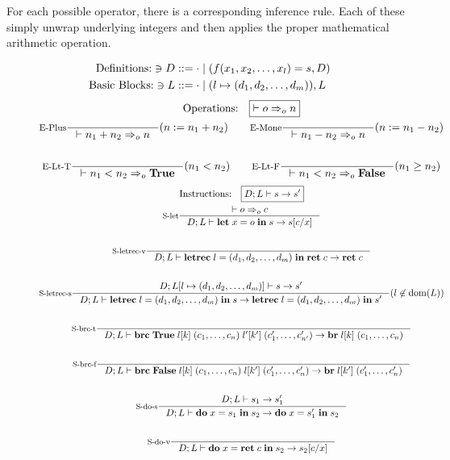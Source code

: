 \documentclass[a4paper, oneside, 10pt, draft]{memoir}
\begin{document}
For each possible operator, there is a corresponding inference
rule. Each of these simply unwrap underlying integers and then applies
the proper mathematical arithmetic operation.
\newcommand{\meval}{:=}
\begin{figure}
  \begin{align*}
    \text{Definitions:} \ni D & ::= \cdot \; \vert \; (f(x_1, x_2, \dotsc,
    x_l) = s, D)\\
    \text{Basic Blocks:} \ni L & ::= \cdot \; \vert \; (l \mapsto (d_1, d_2, \dotsc, d_m)),L
  \end{align*}
  \begin{gather*}
    \text{Operations:} \quad \boxed{|- o \eop n}\\
    \inference[E-Plus]{}{|- n_1 + n_2 \eop n}(n \meval n_1 + n_2)
    \quad \quad
    \inference[E-Mone]{}{|- n_1 - n_2 \eop n}(n \meval n_1 - n_2)\\\\
    \inference[E-Lt-T]{}{|- n_1  < n_2 \eop \btrue}(n_1 < n_2) \quad \quad
    \inference[E-Lt-F]{}{|- n_1  < n_2 \eop \bfalse}(n_1 \geq n_2)
  \end{gather*}
  \begin{gather*}
    \text{Instructions:} \quad \boxed{D;L |- s -> s'}\\
    \inference[S-let]{|- o \eop c}{D;L |- \ilet{x}{o}{s} -> s[c/x]}\\\\
    \inference[S-letrec-v]{}{D;L |- \iletrec{l}{\dbundle}
      {\iret{c}} -> \iret{c}}\\\\
    \inference[S-letrec-s]{D;L[l \mapsto \dbundle] |- s -> s'}
    {D;L |- \iletrec{l}{\dbundle}{s} -> \iletrec{l}{\dbundle}{s'}}(l \not \in \dom{L})\\\\
    \inference[S-brc-t]{}{D;L |-
      \ibrc{\btrue}{\lbl{k}}{(c_1, \dotsc, c_n)}{\lblp{k'}}{(c'_1, \dotsc,
        c'_{n'})} -> \ibr{\lbl{k}}{(c_1, \dotsc, c_n)}}\\\\
    \inference[S-brc-f]{}{D;L |-
      \ibrc{\bfalse}{\lbl{k}}{(c_1, \dotsc, c_n)}{\lbl{{k'}}}{(c'_1, \dotsc, c'_n)} ->
      \ibr{\lbl{{k'}}}{(c'_1, \dotsc, c'_n)}}\\\\
    \inference[S-do-s]{D;L |- s_1 -> s'_1}{D;L |-
      \ido{x}{s_1}{s_2} -> \ido{x}{s'_1}{s_2}}\\\\
    \inference[S-do-v]{}{D;L |- \ido{x}{\iret{c}}{s_2} -> s_2[c/x]}\\\\

\end{gather*}
\end{figure}
\end{document}

